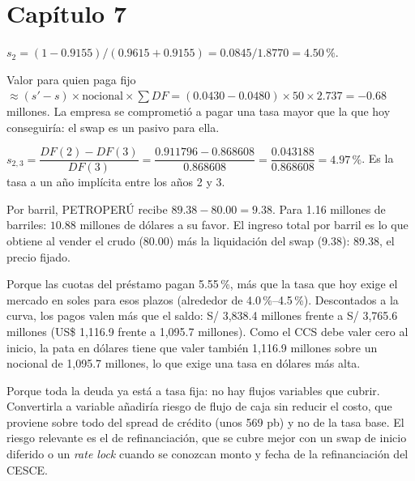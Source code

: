 \section*{Capítulo 7}

 $s_2=(1-0.9155)/(0.9615+0.9155)=0.0845/1.8770=4.50\,\%$.

 Valor para quien paga fijo $\approx(s'-s)\times\text{nocional}\times\sum DF=(0.0430-0.0480)\times50\times2.737=-0.68$ millones. La empresa se comprometió a pagar una tasa mayor que la que hoy conseguiría: el swap es un pasivo para ella.

 $s_{2,3}=\dfrac{DF(2)-DF(3)}{DF(3)}=\dfrac{0.911796-0.868608}{0.868608}=\dfrac{0.043188}{0.868608}=4.97\,\%$. Es la tasa a un año implícita entre los años 2 y 3.

 Por barril, PETROPERÚ recibe $89.38-80.00=9.38$. Para 1.16 millones de barriles: $10.88$ millones de dólares a su favor. El ingreso total por barril es lo que obtiene al vender el crudo (80.00) más la liquidación del swap (9.38): 89.38, el precio fijado.

 Porque las cuotas del préstamo pagan 5.55\,\%, más que la tasa que hoy exige el mercado en soles para esos plazos (alrededor de 4.0\,\%--4.5\,\%). Descontados a la curva, los pagos valen más que el saldo: S/ 3,838.4 millones frente a S/ 3,765.6 millones (US\$ 1,116.9 frente a 1,095.7 millones). Como el CCS debe valer cero al inicio, la pata en dólares tiene que valer también 1,116.9 millones sobre un nocional de 1,095.7 millones, lo que exige una tasa en dólares más alta.

 Porque toda la deuda ya está a tasa fija: no hay flujos variables que cubrir. Convertirla a variable añadiría riesgo de flujo de caja sin reducir el costo, que proviene sobre todo del spread de crédito (unos 569 pb) y no de la tasa base. El riesgo relevante es el de refinanciación, que se cubre mejor con un swap de inicio diferido o un \emph{rate lock} cuando se conozcan monto y fecha de la refinanciación del CESCE.
